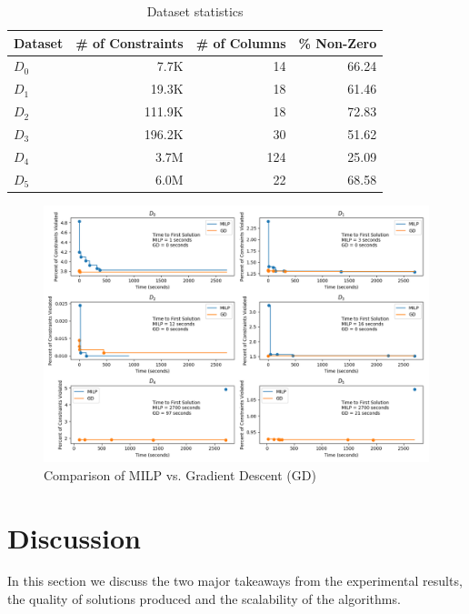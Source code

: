 \documentclass[a4paper]{article}
\begin{document}
\begin{table}[ht!]
\caption{Dataset statistics}
\begin{tabular}{|l|r|r|r|}
\toprule
Dataset &  \# of Constraints &  \# of Columns &  \% Non-Zero \\
\midrule
         $D_0$ &                   7.7K &                 14 &         66.24 \\
         $D_1$ &                  19.3K &                 18 &         61.46 \\
         $D_2$ &                 111.9K &                 18 &         72.83 \\
         $D_3$ &                 196.2K &                 30 &         51.62 \\
         $D_4$ &                3.7M    &                124 &         25.09 \\
         $D_5$ &                6.0M    &                 22 &         68.58 \\
\bottomrule
\end{tabular}
\end{table}

\begin{figure}[ht!]
	\caption{Comparison of MILP vs. Gradient Descent (GD)}
	\includegraphics[width=\textwidth]{./time_series.png}
\end{figure}

\section{Discussion}

In this section we discuss the two major takeaways from the experimental results,
the quality of solutions produced and the scalability of the algorithms.
\end{document}
